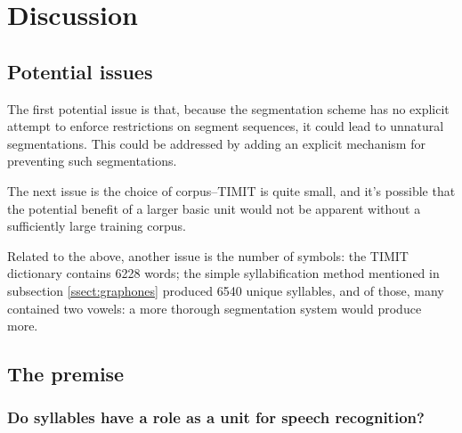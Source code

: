 \documentclass{article}[11pt]
\begin{document}
\section{Discussion}
\label{sect:discussion}

\subsection{Potential issues}
\label{ssect:issues}

The first potential issue is that, because the segmentation scheme has no explicit attempt to enforce restrictions on segment sequences, it could lead to unnatural segmentations. This could be addressed by adding an explicit mechanism for preventing such segmentations.

The next issue is the choice of corpus--TIMIT is quite small, and it's possible that the potential benefit of a larger basic unit would not be apparent without a sufficiently large training corpus.

Related to the above, another issue is the number of symbols: the TIMIT dictionary contains 6228 words; the simple syllabification method mentioned in subsection \ref{ssect:graphones} produced 6540 unique syllables, and of those, many contained two vowels: a more thorough segmentation system would produce more.



\subsection{The premise}
\label{ssect:premise}

\subsubsection{Do syllables have a role as a unit for speech recognition?}
\end{document}
